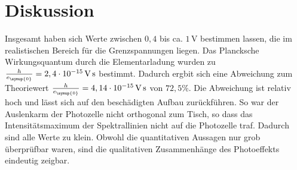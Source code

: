\section{Diskussion}
\label{sec:Diskussion}
Insgesamt haben sich Werte zwischen $0,4$ bis ca. $1\,\unit{\volt}$ bestimmen lassen, die im realistischen
Bereich für die Grenzspannungen liegen. Das Plancksche Wirkungsquantum durch die Elementarladung wurden
zu $\frac{h}{e_{\symup{0}}}=2,4\cdot10^{-15}\,\unit{\volt\second}$ bestimmt. Dadurch ergbit sich eine Abweichung
zum Theoriewert $\frac{h}{e_{\symup{0}}}=4,14\cdot 10^{-15}\,\unit{\volt\second}$ von $72,5\%$. Die Abweichung ist
relativ hoch und lässt sich auf den beschädigten Aufbau zurückführen. So war der Auslenkarm der Photozelle nicht
orthogonal zum Tisch, so dass das Intensitätsmaximum der Spektrallinien nicht auf die Photozelle traf. Dadurch
sind alle Werte zu klein. Obwohl die quantitativen Aussagen nur grob überprüfbar waren, sind die qualitativen
Zusammenhänge des Photoeffekts eindeutig zeigbar.